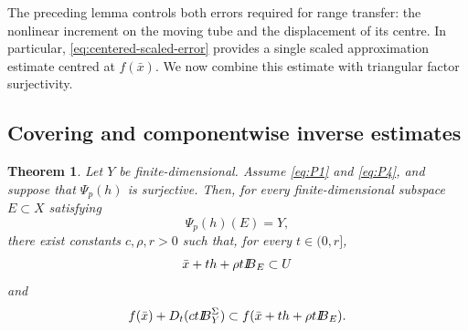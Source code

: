 \documentclass[11pt]{amsart}
\newtheorem{theorem}{Theorem}[section]
\theoremstyle{definition}
\theoremstyle{remark}
\newcommand{\bx}{\bar x}
\def\ball{{I\kern -.35em B}}
\begin{document}
	The preceding lemma controls both errors required for range transfer:
	the nonlinear increment on the moving tube and the displacement of its
	centre. In particular, \eqref{eq:centered-scaled-error} provides a single
	scaled approximation estimate centred at $f(\bx)$. We now combine this
	estimate with triangular factor surjectivity.
	
	\subsection{Covering and componentwise inverse estimates}
	
	\begin{theorem}
		\label{thm:p-factor-covering}
		Let $Y$ be finite-dimensional. Assume \eqref{eq:P1} and \eqref{eq:P4},
		and suppose that $\Psi_p(h)$ is surjective.
		Then, for every finite-dimensional subspace $E\subset X$ satisfying
		$$
		\Psi_p(h)(E)=Y,
		$$
		there exist constants $c,\rho,r>0$ such that, for every
		$t\in(0,r]$,
		$$
		\bx+th+\rho t\ball_E\subset U
		$$
		and
		$$
		f(\bx)+D_t(ct\ball_Y^\Sigma)
		\subset
		f(\bx+th+\rho t\ball_E).
		$$
	\end{theorem}
	
\end{document}
